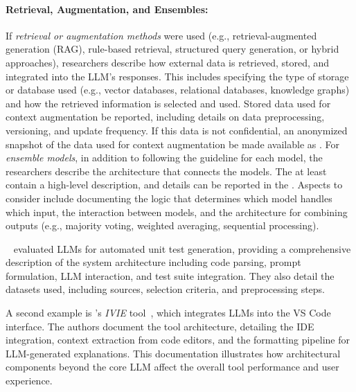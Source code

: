 \paragraph{Retrieval, Augmentation, and Ensembles:}
If \emph{retrieval or augmentation methods} were used (e.g., retrieval-augmented generation (RAG), rule-based retrieval, structured query generation, or hybrid approaches), researchers \must describe how external data is retrieved, stored, and integrated into the LLM's responses.
This includes specifying the type of storage or database used (e.g., vector databases, relational databases, knowledge graphs) and how the retrieved information is selected and used.
Stored data used for context augmentation \must be reported, including details on data preprocessing, versioning, and update frequency.
If this data is not confidential, an anonymized snapshot of the data used for context augmentation \should be made available as \supplementarymaterial.
For \emph{ensemble models}, in addition to following the \modelversion guideline for each model, the researchers \must describe the architecture that connects the models.
The \paper \must at least contain a high-level description, and details can be reported in the \supplementarymaterial.
Aspects to consider include documenting the logic that determines which model handles which input, the interaction between models, and the architecture for combining outputs (e.g., majority voting, weighted averaging, sequential processing).


\citeauthor{DBLP:journals/tse/SchaferNET24}~\cite{DBLP:journals/tse/SchaferNET24} evaluated LLMs for automated unit test generation, providing a comprehensive description of the system architecture including code parsing, prompt formulation, LLM interaction, and test suite integration.
They also detail the datasets used, including sources, selection criteria, and preprocessing steps.

A second example is \citeauthor{DBLP:conf/chi/YanHWH24}'s \emph{IVIE} tool~\cite{DBLP:conf/chi/YanHWH24}, which integrates LLMs into the VS Code interface.
The authors document the tool architecture, detailing the IDE integration, context extraction from code editors, and the formatting pipeline for LLM-generated explanations.
This documentation illustrates how architectural components beyond the core LLM affect the overall tool performance and user experience.


